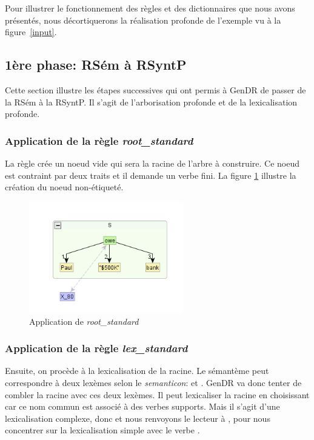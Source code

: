 Pour illustrer le fonctionnement des règles et des dictionnaires que nous avons présentés, nous décortiquerons la réalisation profonde de l'exemple vu à la figure~\ref{input}.

\subsection{1ère phase: RSém à RSyntP}
Cette section illustre les étapes successives qui ont permis à GenDR de passer de la \ac{RSém} à la \ac{RSyntP}. Il s'agit de l'arborisation profonde et de la lexicalisation profonde.

\subsubsection{Application de la règle \emph{root\_standard}}
La règle crée un noeud vide qui sera la racine de l'arbre à construire. Ce noeud est contraint par deux traits et il demande un verbe fini. La figure \ref{fig:rootstand} illustre la création du noeud non-étiqueté.
\begin{figure}[htb]
	\centering
	\includegraphics[width=0.6\textwidth, trim = {0cm 0cm 0cm 0cm},clip]{ch3/figs/inspecteur_root.png}
	\vspace{-0.5cm}
	\caption{Application de \emph{root\_standard}}
	\label{fig:rootstand}
\end{figure}

\subsubsection{Application de la règle \emph{lex\_standard}}
Ensuite, on procède à la lexicalisation de la racine. Le sémantème  peut correspondre à deux lexèmes selon le \emph{semanticon}:  et . GenDR va donc tenter de combler la racine avec ces deux lexèmes. Il peut lexicaliser la racine en choisissant  car ce nom commun est associé à des verbes supports. Mais il s'agit d'une lexicalisation complexe, donc et nous renvoyons le lecteur à \cite{lambrey15,LambreyImplementationcollocationspour2017,lareau18}, pour nous concentrer sur la lexicalisation simple avec le verbe .


